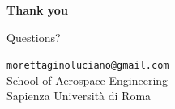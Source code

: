 \documentclass[10pt,aspectratio=169]{beamer}
\begin{document}
\begin{frame}[plain]
\centering
\vspace{2em}
{\Large \textbf{Thank you}}\par
\vspace{1em}
{\large Questions?}\par
\vspace{2em}
\small
\texttt{morettaginoluciano@gmail.com}\\
\medskip
School of Aerospace Engineering\\
Sapienza Universit\`a di Roma
\end{frame}
\end{document}
